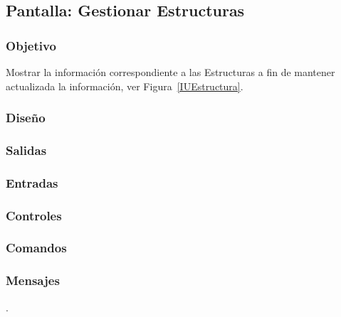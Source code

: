 \subsection{Pantalla: Gestionar Estructuras}

\subsubsection{Objetivo}
Mostrar la información correspondiente a las Estructuras a fin de mantener actualizada la información, ver Figura~\ref{IUEstructura}. 

\subsubsection{Diseño}

\subsubsection{Salidas}


\subsubsection{Entradas}

\subsubsection{Controles}


\subsubsection{Comandos}


\subsubsection{Mensajes}

.
